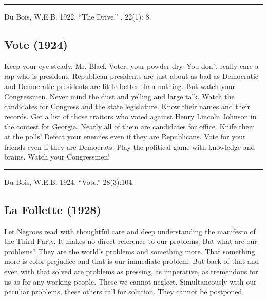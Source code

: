 \documentclass[letterpaper,10pt,english]{jupyterBook}
\begin{document}
\bigskip\hrule\bigskip


\sphinxAtStartPar
{} Du Bois, W.E.B. 1922. “The Drive.” . 22(1): 8.


\subsection{Vote (1924)}
\label{\detokenize{Volumes/28/03/vote:vote-1924}}\label{\detokenize{Volumes/28/03/vote::doc}}
\sphinxAtStartPar
Keep your eye steady, Mr. Black Voter, your powder dry. You don’t really care a rap who is president. Republican presidents are just about as bad as Democratic and Democratic presidents are little better than nothing. But watch your Congressmen. Never mind the dust and yelling and large talk. Watch the candidates for Congress and the state legislature. Know their names and their records. Get a list of those traitors who voted against Henry Lincoln Johnson in the contest for Georgia. Nearly all of them are candidates for office. Knife them at the polls! Defeat your enemies even if they are Republicans. Vote for your friends even if they are Democrats. Play the political game with knowledge and brains. Watch your Congressmen!


\bigskip\hrule\bigskip


\sphinxAtStartPar
{} Du Bois, W.E.B. 1924. “Vote.” 28(3):104.


\subsection{La Follette (1928)}
\label{\detokenize{Volumes/28/04/la_follette:la-follette-1928}}\label{\detokenize{Volumes/28/04/la_follette::doc}}
\sphinxAtStartPar
Let Negroes read with thoughtful care and deep understanding the manifesto of the Third Party. It makes no direct reference to our problems. But what are our problems? They are the world’s problems and something more. That something more is color prejudice and that is our immediate problem. But back of that and even with that solved are problems as pressing, as imperative, as tremendous for us as for any working people. These we cannot neglect. Simultaneously with our peculiar problems,  these others call for solution. They cannot be postponed.
\end{document}
